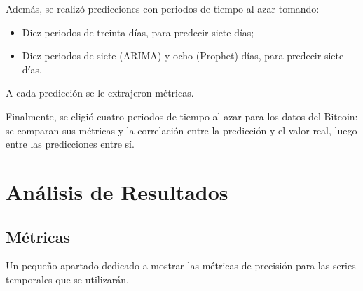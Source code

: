 \documentclass[a4paper,10pt]{article}
\begin{document}
Además, se realizó predicciones con periodos de tiempo al azar tomando:

\begin{itemize}
 \item Diez periodos de treinta días, para predecir siete días;
 \item Diez periodos de siete (ARIMA) y ocho (Prophet) días, para predecir siete días.
\end{itemize}

A cada predicción se le extrajeron métricas.

Finalmente, se eligió cuatro periodos de tiempo al azar para los datos del Bitcoin: se comparan sus métricas y la correlación entre la predicción y el valor real, luego entre las predicciones entre sí.


\section{Análisis de Resultados}



\subsection{Métricas}

Un pequeño apartado dedicado a mostrar las métricas de precisión para las series temporales que se utilizarán.
\end{document}
